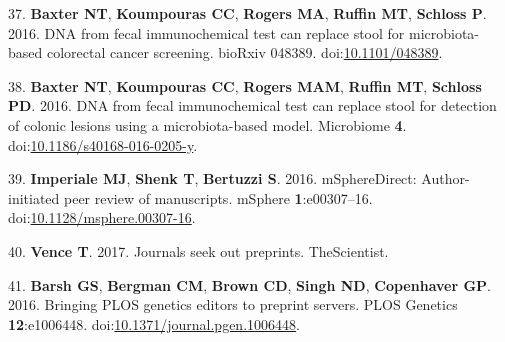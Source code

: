 \documentclass[11pt,]{article}
\begin{document}
\hypertarget{ref-Baxter2016a}{}
37. \textbf{Baxter NT}, \textbf{Koumpouras CC}, \textbf{Rogers MA},
\textbf{Ruffin MT}, \textbf{Schloss P}. 2016. DNA from fecal
immunochemical test can replace stool for microbiota-based colorectal
cancer screening. bioRxiv 048389.
doi:\href{https://doi.org/10.1101/048389}{10.1101/048389}.

\hypertarget{ref-Baxter2016b}{}
38. \textbf{Baxter NT}, \textbf{Koumpouras CC}, \textbf{Rogers MAM},
\textbf{Ruffin MT}, \textbf{Schloss PD}. 2016. DNA from fecal
immunochemical test can replace stool for detection of colonic lesions
using a microbiota-based model. Microbiome \textbf{4}.
doi:\href{https://doi.org/10.1186/s40168-016-0205-y}{10.1186/s40168-016-0205-y}.

\hypertarget{ref-Imperiale2016}{}
39. \textbf{Imperiale MJ}, \textbf{Shenk T}, \textbf{Bertuzzi S}. 2016.
mSphereDirect: Author-initiated peer review of manuscripts. mSphere
\textbf{1}:e00307--16.
doi:\href{https://doi.org/10.1128/msphere.00307-16}{10.1128/msphere.00307-16}.

\hypertarget{ref-Vence2017}{}
40. \textbf{Vence T}. 2017. Journals seek out preprints. TheScientist.

\hypertarget{ref-Barsh2016}{}
41. \textbf{Barsh GS}, \textbf{Bergman CM}, \textbf{Brown CD},
\textbf{Singh ND}, \textbf{Copenhaver GP}. 2016. Bringing PLOS genetics
editors to preprint servers. PLOS Genetics \textbf{12}:e1006448.
doi:\href{https://doi.org/10.1371/journal.pgen.1006448}{10.1371/journal.pgen.1006448}.
\end{document}
